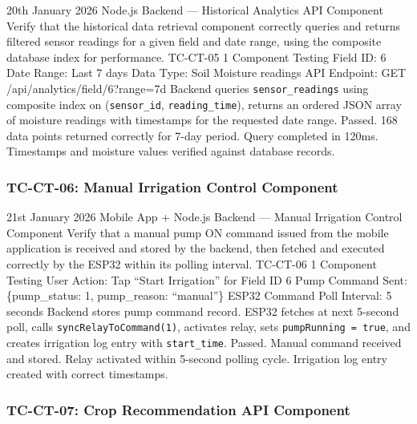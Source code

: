 \testcase%
{20th January 2026}%
{Node.js Backend --- Historical Analytics API Component}%
{Verify that the historical data retrieval component
correctly queries and returns filtered sensor readings for
a given field and date range, using the composite database
index for performance.}%
{TC-CT-05}%
{1}%
{Component Testing}%
{Field ID: 6 \newline
Date Range: Last 7 days \newline
Data Type: Soil Moisture readings \newline
API Endpoint: GET /api/analytics/field/6?range=7d}%
{Backend queries \texttt{sensor\_readings} using composite
index on (\texttt{sensor\_id}, \texttt{reading\_time}),
returns an ordered JSON array of moisture readings with
timestamps for the requested date range.}%
{Passed. 168 data points returned correctly for 7-day
period. Query completed in 120ms. Timestamps and moisture
values verified against database records.}

\subsubsection{TC-CT-06: Manual Irrigation Control Component}

\testcase%
{21st January 2026}%
{Mobile App + Node.js Backend --- Manual Irrigation Control
Component}%
{Verify that a manual pump ON command issued from the
mobile application is received and stored by the backend,
then fetched and executed correctly by the ESP32 within
its polling interval.}%
{TC-CT-06}%
{1}%
{Component Testing}%
{User Action: Tap ``Start Irrigation'' for Field ID 6 \newline
Pump Command Sent: \{pump\_status: 1, pump\_reason:
``manual''\} \newline
ESP32 Command Poll Interval: 5 seconds}%
{Backend stores pump command record. ESP32 fetches at next
5-second poll, calls \texttt{syncRelayToCommand(1)},
activates relay, sets \texttt{pumpRunning = true}, and
creates irrigation log entry with \texttt{start\_time}.}%
{Passed. Manual command received and stored. Relay
activated within 5-second polling cycle. Irrigation log
entry created with correct timestamps.}

\subsubsection{TC-CT-07: Crop Recommendation API Component}


